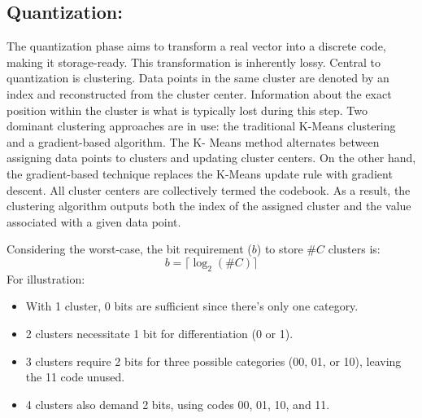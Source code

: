 \documentclass[runningheads]{llncs}
\begin{document}
\subsection{Quantization:} 
 
The quantization phase aims to transform a real vector into a discrete code, making it storage-ready. 
This transformation is inherently lossy. Central to quantization is clustering. Data points in the same 
cluster are denoted by an index and reconstructed from the cluster center. Information about the 
exact position within the cluster is what is typically lost during this step. Two dominant clustering 
approaches are in use: the traditional K-Means clustering and a gradient-based algorithm. The K-
Means method alternates between assigning data points to clusters and updating cluster centers. On 
the other hand, the gradient-based technique replaces the K-Means update rule with gradient 
descent. All cluster centers are collectively termed the codebook. As a result, the clustering algorithm 
outputs both the index of the assigned cluster and the value associated with a given data point. 
 
Considering the worst-case, the bit requirement ($b$) to store $\#C$ clusters is:
\begin{equation}
b = \lceil\log_2(\#C)\rceil
\end{equation}
For illustration:
\begin{itemize}
    \item With 1 cluster, 0 bits are sufficient since there's only one category. 
    \item 2 clusters necessitate 1 bit for differentiation (0 or 1). 
    \item 3 clusters require 2 bits for three possible categories (00, 01, or 10), leaving the 11 code 
unused.
    \item 4 clusters also demand 2 bits, using codes 00, 01, 10, and 11. 
\end{itemize} 
 
\end{document}
